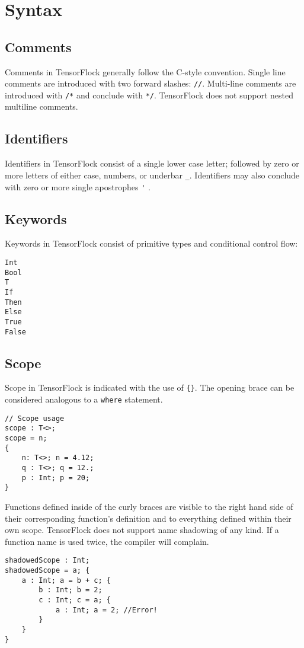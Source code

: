 \section{Syntax}%
\label{sec:syntax}
\subsection{Comments}
Comments in TensorFlock generally follow the C-style convention. Single line
comments are introduced with two forward slashes: \lstinline|//|. Multi-line
comments are introduced with \lstinline|/*| and conclude with \lstinline|*/|.
TensorFlock does not support nested multiline comments.
\subsection{Identifiers}
Identifiers in TensorFlock consist of a single lower case letter; followed by zero 
or more letters of either case, numbers, or underbar \lstinline|_|.
Identifiers may also conclude with zero or more single apostrophes \lstinline|'| .
\subsection{Keywords}
Keywords in TensorFlock consist of primitive types and conditional control flow:
\begin{lstlisting}
Int
Bool
T
If
Then
Else
True
False
\end{lstlisting}
\subsection{Scope}
Scope in TensorFlock is indicated with the use of \lstinline|{}|. The opening brace can be considered analogous to a \lstinline|where| statement.
\begin{lstlisting}
// Scope usage
scope : T<>;
scope = n; 
{ 
    n: T<>; n = 4.12;
    q : T<>; q = 12.; 
    p : Int; p = 20;
}
\end{lstlisting}
Functions defined inside of the curly braces are visible to the right hand
side of their corresponding function's definition and to everything defined
within their own scope. TensorFlock does not support name shadowing of any
kind. If a function name is used twice, the compiler will complain.

\begin{lstlisting}
shadowedScope : Int;
shadowedScope = a; {
    a : Int; a = b + c; {
        b : Int; b = 2;
        c : Int; c = a; { 
            a : Int; a = 2; //Error!
        }
    }
}
\end{lstlisting}

